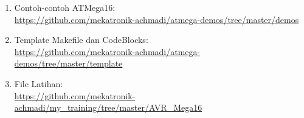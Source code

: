 \documentclass[12pt,]{article}
\begin{document}
	\begin{enumerate}
		\item Contoh-contoh ATMega16:\\
		\url{https://github.com/mekatronik-achmadi/atmega-demos/tree/master/demos}
		
		\item Template Makefile dan CodeBlocks:\\
		\url{https://github.com/mekatronik-achmadi/atmega-demos/tree/master/template}
		
		\item File Latihan:\\
		\url{https://github.com/mekatronik-achmadi/my_training/tree/master/AVR_Mega16}
	\end{enumerate}
	
\end{document}
